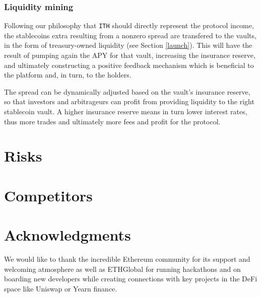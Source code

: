 \documentclass[a4paper,10 pt]{article}
\theoremstyle{definition}
\begin{document}
\subsubsection{Liquidity mining}
Following our philosophy that \verb|ITH| should directly represent the protocol income, the stablecoins extra resulting from a nonzero spread are transfered to the vaults, in the form of treasury-owned liquidity (see Section \ref{launch}). This will have the result of pumping again the APY for that vault, increasing the insurance reserve, and ultimately constructing a positive feedback mechanism which is beneficial to the platform and, in turn, to the holders.

The spread can be dynamically adjusted based on the vault's insurance reserve, so that investors and arbitrageurs can profit from providing liquidity to the right stablecoin vault. A higher insurance reserve means in turn lower interest rates, thus more trades and ultimately more fees and profit for the protocol.


\section{Risks}

\section{Competitors}

\section{Acknowledgments}

We would like to thank the incredible Ethereum community for its support and welcoming atmosphere as well as ETHGlobal for running hackathons and on boarding new developers while creating connections with key projects in the DeFi space like Uniswap or Yearn finance.
\end{document}
